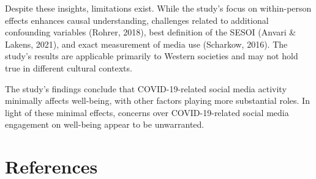 \documentclass[
  man,mask,floatsintext]{apa7}
\begin{document}
Despite these insights, limitations exist. While the study's focus on within-person effects enhances causal understanding, challenges related to additional confounding variables (Rohrer, 2018), best definition of the SESOI (Anvari \& Lakens, 2021), and exact measurement of media use (Scharkow, 2016). The study's results are applicable primarily to Western societies and may not hold true in different cultural contexts.

The study's findings conclude that COVID-19-related social media activity minimally affects well-being, with other factors playing more substantial roles. In light of these minimal effects, concerns over COVID-19-related social media engagement on well-being appear to be unwarranted.

\newpage

\hypertarget{references}{%
\section{References}\label{references}}
\end{document}
